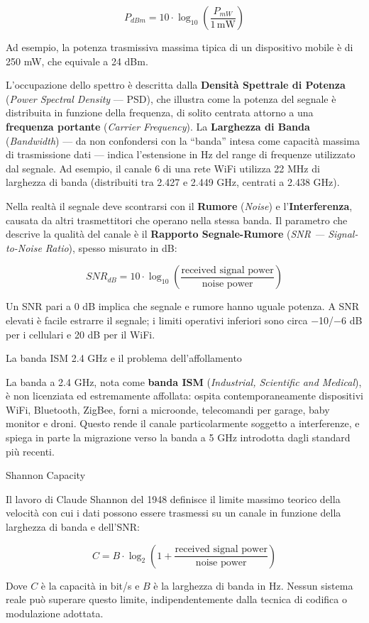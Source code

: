 \documentclass[
  italian,
  openany]{book}
\begin{document}
\[P_{dBm}=10\cdot \log_{10}\left(\frac{P_{mW}}{1\,\text{mW}}\right)\]

Ad esempio, la potenza trasmissiva massima tipica di un dispositivo
mobile è di 250 mW, che equivale a 24 dBm.

L'occupazione dello spettro è descritta dalla \textbf{Densità Spettrale
di Potenza} (\emph{Power Spectral Density} --- PSD), che illustra come
la potenza del segnale è distribuita in funzione della frequenza, di
solito centrata attorno a una \textbf{frequenza portante} (\emph{Carrier
Frequency}). La \textbf{Larghezza di Banda} (\emph{Bandwidth}) --- da
non confondersi con la ``banda'' intesa come capacità massima di
trasmissione dati --- indica l'estensione in Hz del range di frequenze
utilizzato dal segnale. Ad esempio, il canale 6 di una rete WiFi
utilizza 22 MHz di larghezza di banda (distribuiti tra 2.427 e 2.449
GHz, centrati a 2.438 GHz).

Nella realtà il segnale deve scontrarsi con il \textbf{Rumore}
(\emph{Noise}) e l'\textbf{Interferenza}, causata da altri trasmettitori
che operano nella stessa banda. Il parametro che descrive la qualità del
canale è il \textbf{Rapporto Segnale-Rumore} (\emph{SNR ---
Signal-to-Noise Ratio}), spesso misurato in dB:

\[SNR_{dB}=10\cdot \log_{10}\left(\frac{\text{received signal power}}{\text{noise power}}\right)\]

Un SNR pari a 0 dB implica che segnale e rumore hanno uguale potenza. A
SNR elevati è facile estrarre il segnale; i limiti operativi inferiori
sono circa −10/−6 dB per i cellulari e 20 dB per il WiFi.

\begin{calloutnote}{La banda ISM 2.4 GHz e il problema dell’affollamento}

La banda a 2.4 GHz, nota come \textbf{banda ISM} (\emph{Industrial,
Scientific and Medical}), è non licenziata ed estremamente affollata:
ospita contemporaneamente dispositivi WiFi, Bluetooth, ZigBee, forni a
microonde, telecomandi per garage, baby monitor e droni. Questo rende il
canale particolarmente soggetto a interferenze, e spiega in parte la
migrazione verso la banda a 5 GHz introdotta dagli standard più recenti.

\end{calloutnote}

\begin{calloutdefinition}{Shannon Capacity}

Il lavoro di Claude Shannon del 1948 definisce il limite massimo teorico
della velocità con cui i dati possono essere trasmessi su un canale in
funzione della larghezza di banda e dell'SNR:

\[C = B \cdot \log_{2}\!\left(1 + \frac{\text{received signal power}}{\text{noise power}}\right)\]

Dove \(C\) è la capacità in bit/s e \(B\) è la larghezza di banda in Hz.
Nessun sistema reale può superare questo limite, indipendentemente dalla
tecnica di codifica o modulazione adottata.

\end{calloutdefinition}
\end{document}
